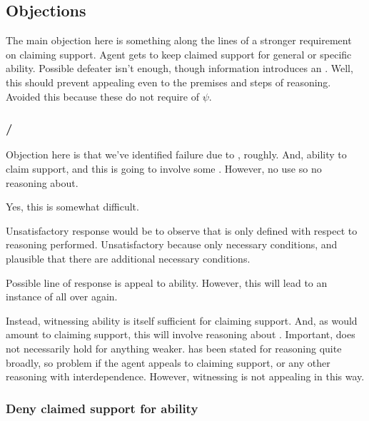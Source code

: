 \subsection{Objections}

\begin{note}
  The main objection here is something along the lines of a stronger requirement on claiming support.
  Agent gets to keep claimed support for general or specific ability.
  Possible defeater isn't enough, though information introduces an \expec{}.
  Well, this should prevent appealing even to the premises and steps of reasoning.
  Avoided this because these do not require \expec{} of \(\psi\).
\end{note}

\subsubsection{/}
\label{sec:requ1}

\begin{note}
  Objection here is that we've identified failure due to , roughly.
  And, ability to claim support, and this is going to involve some .
  However, no use so no reasoning about.

  Yes, this is somewhat difficult.

  Unsatisfactory response would be to observe that \requ{} is only defined with respect to reasoning performed.
  Unsatisfactory because only necessary conditions, and plausible that there are additional necessary conditions.

  Possible line of response is appeal to ability.
  However, this will lead to an instance of \nI{} all over again.

  Instead, witnessing ability is itself sufficient for claiming support.
  And, as would amount to claiming support, this will involve reasoning about \requ{}.
  Important, \EAS{} does not necessarily hold for anything weaker.
  \nI{} has been stated for reasoning quite broadly, so problem if the agent appeals to claiming support, or any other reasoning with interdependence.
  However, witnessing is not appealing in this way.
\end{note}

\subsubsection{Deny claimed support for ability}

